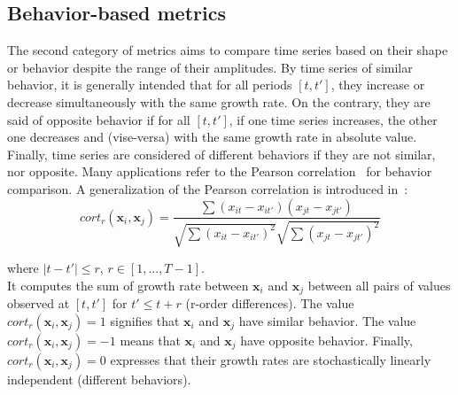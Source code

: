 
\subsection{Behavior-based metrics}

The second category of metrics aims to compare time series based on their shape or behavior despite the range of their amplitudes. By time series of similar behavior, it is generally intended that for all periods $[t,t']$, they increase or decrease simultaneously with the same growth rate. On the contrary, they are said of opposite behavior if for all $[t,t']$, if one time series increases, the other one decreases and (vise-versa) with the same growth rate in absolute value. Finally, time series are considered of different behaviors if they are not similar, nor opposite. Many applications refer to the Pearson correlation~\cite{Abraham2010a,Benesty2009} for behavior comparison. A generalization of the Pearson correlation is introduced in~\cite{AhlameDouzal-Chouakria2011}: 
\begin{equation}	
	cort_r(\textbf{x}_i,\textbf{x}_j) = 
	\frac{
		\sum 
		{
			(x_{it}-x_{it'})
			(x_{jt}-x_{jt'})
		}
	}
	{
		\sqrt{
			\sum 
			{(x_{it}-x_{it'})^2}
		} 
		\sqrt{
			\sum 
			{(x_{jt}-x_{jt'})^2}
		} 	 
	}
\label{eq:corTr}
\end{equation}

\noindent where $|t-t'| \leq r$, $r \in [1,..., T-1]$. \\ 

\noindent It computes the sum of growth rate between $\textbf{x}_i$ and $\textbf{x}_j$ between all pairs of values observed at $[t ,t']$ for $t' \leq t+r$ (r-order differences). The value $cort_r(\textbf{x}_i,\textbf{x}_j) = 1$ signifies that $\textbf{x}_i$ and $\textbf{x}_j$  have similar behavior. The value $cort_r(\textbf{x}_i,\textbf{x}_j) = -1$ means that $\textbf{x}_i$ and $\textbf{x}_j$ have opposite behavior. Finally, $cort_r(\textbf{x}_i,\textbf{x}_j) = 0$ expresses that their growth rates are stochastically linearly independent (different behaviors). 

